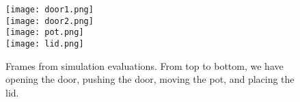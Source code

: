 \begin{figure}
	\centering
	\texttt{[image: door1.png]}\\
	\vspace{1em}             
	\texttt{[image: door2.png]}\\
	\vspace{1em}             
	\texttt{[image: pot.png]}\\
	\vspace{1em}             
	\texttt{[image: lid.png]}
	\caption{Frames from simulation evaluations. From top to bottom, we have opening the door, pushing the door, moving the pot, and placing the lid.}
	\label{figure:sim-eval}
\end{figure}
